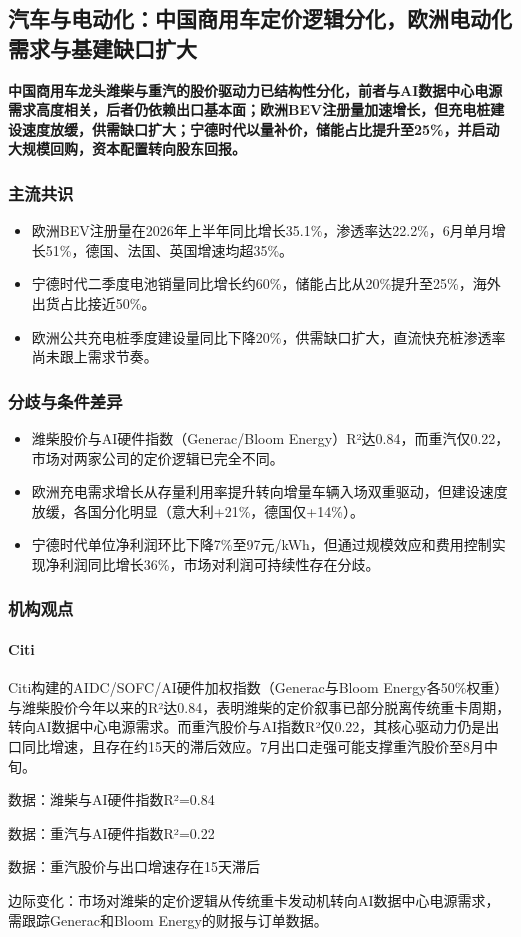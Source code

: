 \documentclass[11pt]{ctexart}
\begin{document}
\subsection{汽车与电动化：中国商用车定价逻辑分化，欧洲电动化需求与基建缺口扩大}
\textbf{中国商用车龙头潍柴与重汽的股价驱动力已结构性分化，前者与AI数据中心电源需求高度相关，后者仍依赖出口基本面；欧洲BEV注册量加速增长，但充电桩建设速度放缓，供需缺口扩大；宁德时代以量补价，储能占比提升至25\%，并启动大规模回购，资本配置转向股东回报。}
\subsubsection*{主流共识}
\begin{itemize}
  \item 欧洲BEV注册量在2026年上半年同比增长35.1\%，渗透率达22.2\%，6月单月增长51\%，德国、法国、英国增速均超35\%。
  \item 宁德时代二季度电池销量同比增长约60\%，储能占比从20\%提升至25\%，海外出货占比接近50\%。
  \item 欧洲公共充电桩季度建设量同比下降20\%，供需缺口扩大，直流快充桩渗透率尚未跟上需求节奏。
\end{itemize}
\subsubsection*{分歧与条件差异}
\begin{itemize}
  \item 潍柴股价与AI硬件指数（Generac/Bloom Energy）R²达0.84，而重汽仅0.22，市场对两家公司的定价逻辑已完全不同。
  \item 欧洲充电需求增长从存量利用率提升转向增量车辆入场双重驱动，但建设速度放缓，各国分化明显（意大利+21\%，德国仅+14\%）。
  \item 宁德时代单位净利润环比下降7\%至97元/kWh，但通过规模效应和费用控制实现净利润同比增长36\%，市场对利润可持续性存在分歧。
\end{itemize}
\subsubsection*{机构观点}
\paragraph{Citi} Citi构建的AIDC/SOFC/AI硬件加权指数（Generac与Bloom Energy各50\%权重）与潍柴股价今年以来的R²达0.84，表明潍柴的定价叙事已部分脱离传统重卡周期，转向AI数据中心电源需求。而重汽股价与AI指数R²仅0.22，其核心驱动力仍是出口同比增速，且存在约15天的滞后效应。7月出口走强可能支撑重汽股价至8月中旬。
{\small\color{refgray}数据：潍柴与AI硬件指数R²=0.84\par}
{\small\color{refgray}数据：重汽与AI硬件指数R²=0.22\par}
{\small\color{refgray}数据：重汽股价与出口增速存在15天滞后\par}
{\small\color{refgray}边际变化：市场对潍柴的定价逻辑从传统重卡发动机转向AI数据中心电源需求，需跟踪Generac和Bloom Energy的财报与订单数据。\par}
\end{document}
